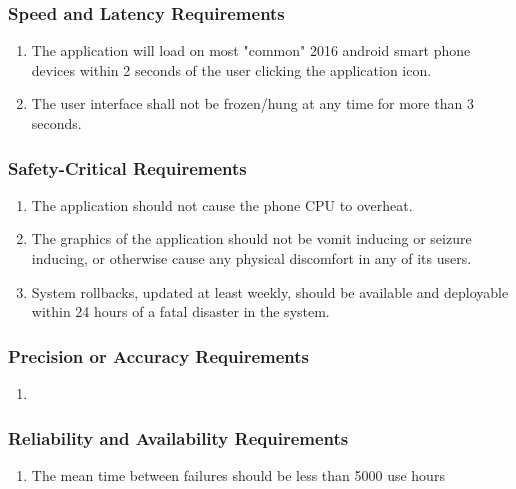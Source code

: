 \documentclass[]{article}
\begin{document}
\subsubsection{Speed and Latency Requirements}
\label{ssub:speed_and_latency_requirements}
\begin{enumerate}[{PR}1. ]
	\item The application will load on most "common" 2016 android smart phone devices within 2 seconds of the user clicking the application icon.
	\item The user interface shall not be frozen/hung at any time for more than 3 seconds.
\end{enumerate}

\subsubsection{Safety-Critical Requirements}
\label{ssub:safety_critical_requirements}
\begin{enumerate}[{PR}1. ]
	\item The application should not cause the phone CPU to overheat.
	\item The graphics of the application should not be vomit inducing or seizure inducing, or otherwise cause any physical discomfort in any of its users.
	\item System rollbacks, updated at least weekly, should be available and deployable within 24 hours of a fatal disaster in the system. 
\end{enumerate}

\subsubsection{Precision or Accuracy Requirements}
\label{ssub:precision_or_accuracy_requirements}
\begin{enumerate}[{PR}1. ]
	\item 
\end{enumerate}

\subsubsection{Reliability and Availability Requirements}
\label{ssub:reliability_and_availability_requirements}
\begin{enumerate}[{PR}1. ]
	\item The mean time between failures should be less than 5000 use hours
\end{enumerate}
\end{document}
